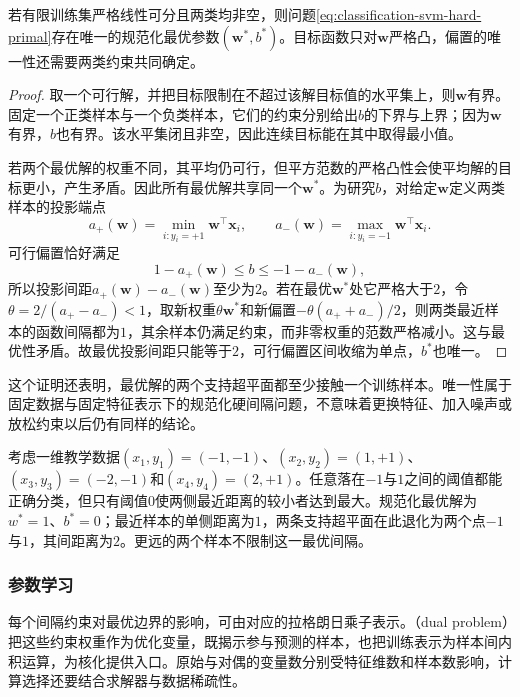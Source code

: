 \begin{theorem}[硬间隔解的存在性与唯一性]
  \label{thm:classification-svm-hard-unique}
  若有限训练集严格线性可分且两类均非空，则问题\eqref{eq:classification-svm-hard-primal}存在唯一的规范化最优参数$(\bm{w}^{\ast},b^{\ast})$。目标函数只对$\bm{w}$严格凸，偏置的唯一性还需要两类约束共同确定。
\end{theorem}
\begin{proof}
取一个可行解，并把目标限制在不超过该解目标值的水平集上，则$\bm{w}$有界。固定一个正类样本与一个负类样本，它们的约束分别给出$b$的下界与上界；因为$\bm{w}$有界，$b$也有界。该水平集闭且非空，因此连续目标能在其中取得最小值。

若两个最优解的权重不同，其平均仍可行，但平方范数的严格凸性会使平均解的目标更小，产生矛盾。因此所有最优解共享同一个$\bm{w}^{\ast}$。为研究$b$，对给定$\bm{w}$定义两类样本的投影端点
\[
  a_+(\bm{w})=\min_{i:y_i=+1}\bm{w}^{\top}\bm{x}_i,
  \qquad
  a_-(\bm{w})=\max_{i:y_i=-1}\bm{w}^{\top}\bm{x}_i.
\]
可行偏置恰好满足
\[
  1-a_+(\bm{w})\le b\le-1-a_-(\bm{w}),
\]
所以投影间距$a_+(\bm{w})-a_-(\bm{w})$至少为$2$。若在最优$\bm{w}^{\ast}$处它严格大于$2$，令$\theta=2/(a_+-a_-)<1$，取新权重$\theta\bm{w}^{\ast}$和新偏置$-\theta(a_++a_-)/2$，则两类最近样本的函数间隔都为$1$，其余样本仍满足约束，而非零权重的范数严格减小。这与最优性矛盾。故最优投影间距只能等于$2$，可行偏置区间收缩为单点，$b^{\ast}$也唯一。
\end{proof}

这个证明还表明，最优解的两个支持超平面都至少接触一个训练样本。唯一性属于固定数据与固定特征表示下的规范化硬间隔问题，不意味着更换特征、加入噪声或放松约束以后仍有同样的结论。

\begin{example}[单侧间隔与带宽]
  \label{ex:classification-svm-one-dimensional}
  考虑一维教学数据$(x_1,y_1)=(-1,-1)$、$(x_2,y_2)=(1,+1)$、$(x_3,y_3)=(-2,-1)$和$(x_4,y_4)=(2,+1)$。任意落在$-1$与$1$之间的阈值都能正确分类，但只有阈值$0$使两侧最近距离的较小者达到最大。规范化最优解为$w^{\ast}=1$、$b^{\ast}=0$；最近样本的单侧距离为$1$，两条支持超平面在此退化为两个点$-1$与$1$，其间距离为$2$。更远的两个样本不限制这一最优间隔。
\end{example}

\subsubsection{参数学习}
\label{sec:classification-svm-learning}

每个间隔约束对最优边界的影响，可由对应的拉格朗日乘子表示。（dual problem）把这些约束权重作为优化变量，既揭示参与预测的样本，也把训练表示为样本间内积运算，为核化提供入口。原始与对偶的变量数分别受特征维数和样本数影响，计算选择还要结合求解器与数据稀疏性。

